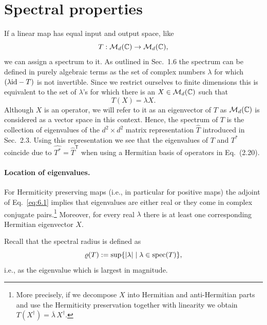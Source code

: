\documentclass[11pt,a4paper]{article}
\theoremstyle{plain}
\theoremstyle{definition}
\theoremstyle{remark}
\begin{document}
\setcounter{section}{5}

\section{Spectral properties}

If a linear map has equal input and output space, like
\[
    T : \mathcal{M}_d(\mathbb{C})\to \mathcal{M}_d(\mathbb{C}),
\]
we can assign a spectrum to it. As outlined in Sec.~1.6 the spectrum can be
defined in purely algebraic terms as the set of complex numbers $\lambda$ for
which $(\lambda \mathrm{id}-T)$ is not invertible. Since we restrict ourselves to finite
dimensions this is equivalent to the set of $\lambda$'s for which there is an
$X\in \mathcal{M}_d(\mathbb{C})$ such that
\begin{equation}\tag{6.1}\label{eq:6.1}
    T(X)=\lambda X.
\end{equation}
Although $X$ is an operator, we will refer to it as an eigenvector of $T$ as
$\mathcal{M}_d(\mathbb{C})$ is considered as a vector space in this context. Hence, the
spectrum of $T$ is the collection of eigenvalues of the $d^2\times d^2$ matrix
representation $\widehat{T}$ introduced in Sec.~2.3. Using this representation
we see that the eigenvalues of $T$ and $T^*$ coincide due to
$\widehat{T^*}=\widehat{T}^{\mathsf T}$ when using a Hermitian basis of operators
in Eq.~(2.20).

\paragraph{Location of eigenvalues.}
For Hermiticity preserving maps (i.e., in particular for positive maps) the
adjoint of Eq.~\eqref{eq:6.1} implies that eigenvalues are either real or they
come in complex conjugate pairs.\footnote{More precisely, if we decompose $X$
    into Hermitian and anti-Hermitian parts and use the Hermiticity preservation
    together with linearity we obtain $T(X^\dagger)=\overline{\lambda}\,X^\dagger$.}
Moreover, for every real $\lambda$ there is at least one corresponding Hermitian
eigenvector $X$.

Recall that the spectral radius is defined as
\[
    \varrho(T):=\sup\{|\lambda| \mid \lambda\in\operatorname{spec}(T)\},
\]
i.e., as the eigenvalue which is largest in magnitude.
\end{document}
